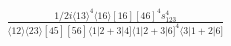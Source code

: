 \documentclass[varwidth, border=5pt]{standalone}
\begin{document}
\begin{my}
$\begin{gathered}
\scriptscriptstyle\frac{1/2i\langle13\rangle^4\langle16\rangle[16][46]^4s_{123}^4}{\langle12\rangle\langle23\rangle[45][56]\langle1|2+3|4]\langle1|2+3|6]^4\langle3|1+2|6]}
\end{gathered}$
\end{my}
\end{document}

